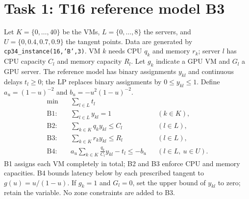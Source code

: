 \documentclass[10pt]{article}
\begin{document}
\section*{Task 1: T16 reference model B3}
Let $K=\{0,\ldots,40\}$ be the VMs, $L=\{0,\ldots,8\}$ the servers,
and $U=\{0,0.4,0.7,0.9\}$ the tangent points. Data are generated by
\texttt{cp34\_instance(16,'B',3)}. VM $k$ needs CPU $q_k$ and memory $r_k$;
server $l$ has CPU capacity $C_l$ and memory capacity $R_l$.
Let $g_k$ indicate a GPU VM and $G_l$ a GPU server.
The reference model has binary assignments $y_{kl}$ and continuous delays
$t_l\ge0$; the LP replaces binary assignments by $0\le y_{kl}\le1$.
Define $a_u=(1-u)^{-2}$ and $b_u=-u^2(1-u)^{-2}$.
\begin{align*}
\min\quad &\sum_{l\in L}t_l\\
\text{B1: }&\sum_{l\in L}y_{kl}=1 &&(k\in K),\\
\text{B2: }&\sum_{k\in K}q_k y_{kl}\le C_l &&(l\in L),\\
\text{B3: }&\sum_{k\in K}r_k y_{kl}\le R_l &&(l\in L),\\
\text{B4: }&a_u\sum_{k\in K}\frac{q_k}{C_l}y_{kl}-t_l\le-b_u
&&(l\in L,\ u\in U).
\end{align*}
B1 assigns each VM completely in total; B2 and B3 enforce CPU and memory
capacities. B4 bounds latency below by each prescribed tangent to
$g(u)=u/(1-u)$. If $g_k=1$ and $G_l=0$, set the upper bound of $y_{kl}$
to zero; retain the variable. No zone constraints are added to B3.
\end{document}
